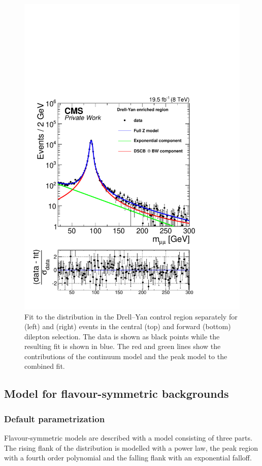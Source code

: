 \begin{figure}[htbp]
\begin{minipage}[t]{0.49\textwidth}
\includegraphics[width=\textwidth]{plots/results/fit/expoFitMM_Log_Forward.pdf}
\end{minipage}
\caption{Fit to the \mll distribution in the Drell--Yan control region separately for \EE (left) and \MM (right) events in the central (top) and forward (bottom) dilepton selection. The data is shown as black points while the resulting fit is shown in blue. The red and green lines show the contributions of the continuum model and the peak model to the combined fit.}
\label{fig:dyFits}
\end{figure}


\subsection{Model for flavour-symmetric backgrounds}

\subsubsection{Default parametrization}
Flavour-symmetric models are described with a model consisting of three parts. The rising flank of the distribution is modelled with a power law, the peak region with a fourth order polynomial and the falling flank with an exponential falloff. 

